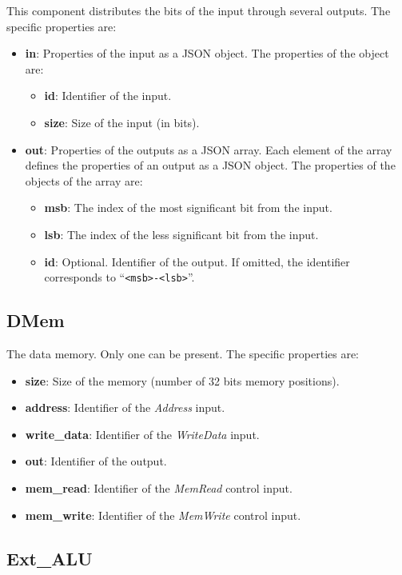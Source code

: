 \documentclass[11pt,a4paper,twoside,titlepage]{report}
\begin{document}
This component distributes the bits of the input through several outputs.
The specific properties are:
\begin{itemize}
	\item \textbf{in}: Properties of the input as a JSON object.
		The properties of the object are:
		\begin{itemize}
			\item \textbf{id}: Identifier of the input.
			\item \textbf{size}: Size of the input (in bits).
		\end{itemize}
	\item \textbf{out}: Properties of the outputs as a JSON array.
		Each element of the array defines the properties of an output as a
		JSON object. The properties of the objects of the array are:
		\begin{itemize}
			\item \textbf{msb}: The index of the most significant bit from the input.
			\item \textbf{lsb}: The index of the less significant bit from the input.
			\item \textbf{id}: Optional. Identifier of the output. If omitted,
				the identifier corresponds to ``\verb+<msb>-<lsb>+''.
		\end{itemize}
\end{itemize}

\subsection{DMem}

The data memory. Only one can be present. The specific properties are:
\begin{itemize}
	\item \textbf{size}: Size of the memory (number of 32 bits memory positions).
	\item \textbf{address}: Identifier of the \textit{Address} input.
	\item \textbf{write\_data}: Identifier of the \textit{WriteData} input.
	\item \textbf{out}: Identifier of the output.
	\item \textbf{mem\_read}: Identifier of the \textit{MemRead} control input.
	\item \textbf{mem\_write}: Identifier of the \textit{MemWrite} control input.
\end{itemize}

\subsection{Ext\_ALU}
\end{document}
